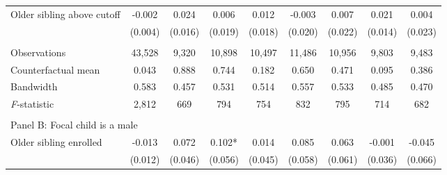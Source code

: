 \begin{table}[!htbp]
{{\begin{tabular}{lcccccccc}
Older sibling above cutoff&      -0.002   &       0.024   &       0.006   &       0.012   &      -0.003   &       0.007   &       0.021   &       0.004   \\
                    &     (0.004)   &     (0.016)   &     (0.019)   &     (0.018)   &     (0.020)   &     (0.022)   &     (0.014)   &     (0.023)   \\
                    &               &               &               &               &               &               &               &               \\
Observations        &      43,528   &       9,320   &      10,898   &      10,497   &      11,486   &      10,956   &       9,803   &       9,483   \\
Counterfactual mean &       0.043   &       0.888   &       0.744   &       0.182   &       0.650   &       0.471   &       0.095   &       0.386   \\
Bandwidth           &       0.583   &       0.457   &       0.531   &       0.514   &       0.557   &       0.533   &       0.485   &       0.470   \\
\textit{F}-statistic&       2,812   &         669   &         794   &         754   &         832   &         795   &         714   &         682   \\
 
&  &  &  &  \\
\multicolumn{10}{l}{Panel B: Focal child is a male} \\
Older sibling enrolled&      -0.013   &       0.072   &       0.102*  &       0.014   &       0.085   &       0.063   &      -0.001   &      -0.045   \\
                    &     (0.012)   &     (0.046)   &     (0.056)   &     (0.045)   &     (0.058)   &     (0.061)   &     (0.036)   &     (0.066)   \\
 

\end{tabular}}}
\end{table}
